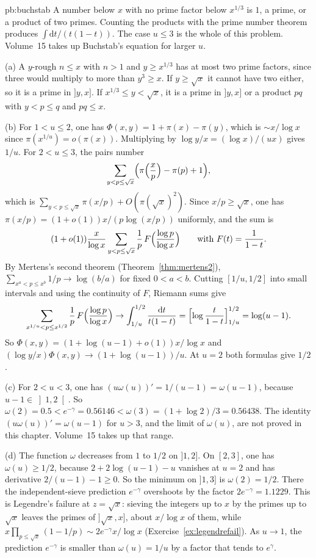 \begin{solution}{pb:buchstab}
\idea A number below $x$ with no prime factor below $x^{1/3}$ is $1$, a prime, or a product of two primes. Counting the products with the prime number theorem produces $\int\mathrm dt/(t(1-t))$. The case $u\le3$ is the whole of this problem. Volume~15 takes up Buchstab's equation for larger $u$.

\writeup (a) A $y$-rough $n\le x$ with $n>1$ and $y\ge x^{1/3}$ has at most two prime factors, since three would multiply to more than $y^3\ge x$. If $y\ge\sqrt x$ it cannot have two either, so it is a prime in $]y,x]$. If $x^{1/3}\le y<\sqrt x$, it is a prime in $]y,x]$ or a product $pq$ with $y<p\le q$ and $pq\le x$.

(b) For $1<u\le2$, one has $\Phi(x,y)=1+\pi(x)-\pi(y)$, which is $\sim x/\log x$ since $\pi(x^{1/u})=o(\pi(x))$. Multiplying by $\log y/x=(\log x)/(ux)$ gives $1/u$. For $2<u\le3$, the pairs number
\[
\sum_{y<p\le\sqrt x}\Bigl(\pi\Bigl(\frac xp\Bigr)-\pi(p)+1\Bigr),
\]
which is $\sum_{y<p\le\sqrt x}\pi(x/p)+O(\pi(\sqrt x)^2)$. Since $x/p\ge\sqrt x$, one has $\pi(x/p)=(1+o(1))x/(p\log(x/p))$ uniformly, and the sum is
\[
(1+o(1))\frac x{\log x}\sum_{y<p\le\sqrt x}\frac1p\,F\Bigl(\frac{\log p}{\log x}\Bigr)\qquad\text{with }F(t)=\frac1{1-t}.
\]
By Mertens's second theorem (Theorem~\ref{thm:mertens2}), $\sum_{x^a<p\le x^b}1/p\to\log(b/a)$ for fixed $0<a<b$. Cutting $[1/u,1/2]$ into small intervals and using the continuity of $F$, Riemann sums give
\[
\sum_{x^{1/u}<p\le x^{1/2}}\frac1p\,F\Bigl(\frac{\log p}{\log x}\Bigr)\to\int_{1/u}^{1/2}\frac{\mathrm dt}{t(1-t)}=\Bigl[\log\frac t{1-t}\Bigr]_{1/u}^{1/2}=\log(u-1).
\]
So $\Phi(x,y)=(1+\log(u-1)+o(1))x/\log x$ and $(\log y/x)\Phi(x,y)\to(1+\log(u-1))/u$. At $u=2$ both formulas give $1/2$.

(c) For $2<u<3$, one has $(u\omega(u))'=1/(u-1)=\omega(u-1)$, because $u-1\in\left]1,2\right[$. So $\omega(2)=0.5<e^{-\gamma}=0.56146<\omega(3)=(1+\log2)/3=0.56438$. The identity $(u\omega(u))'=\omega(u-1)$ for $u>3$, and the limit of $\omega(u)$, are not proved in this chapter. Volume~15 takes up that range.

(d) The function $\omega$ decreases from $1$ to $1/2$ on $]1,2]$. On $[2,3]$, one has $\omega(u)\ge1/2$, because $2+2\log(u-1)-u$ vanishes at $u=2$ and has derivative $2/(u-1)-1\ge0$. So the minimum on $]1,3]$ is $\omega(2)=1/2$. There the independent-sieve prediction $e^{-\gamma}$ overshoots by the factor $2e^{-\gamma}=1.1229$. This is Legendre's failure at $z=\sqrt x$: sieving the integers up to $x$ by the primes up to $\sqrt x$ leaves the primes of $]\sqrt x,x]$, about $x/\log x$ of them, while $x\prod_{p\le\sqrt x}(1-1/p)\sim2e^{-\gamma}x/\log x$ (Exercise~\ref{ex:legendrefail}). As $u\to1$, the prediction $e^{-\gamma}$ is smaller than $\omega(u)=1/u$ by a factor that tends to $e^{\gamma}$.


\end{solution}
